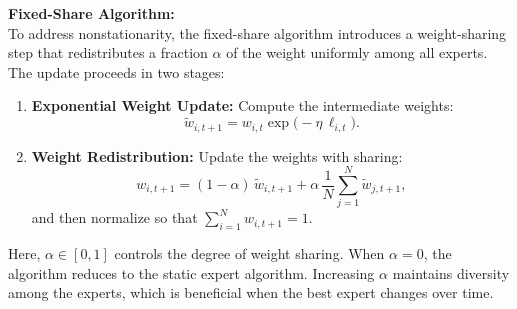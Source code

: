 \documentclass{article}
\begin{document}
\noindent\textbf{Fixed-Share Algorithm:} \\
To address nonstationarity, the fixed-share algorithm introduces a weight-sharing step that redistributes a fraction $\alpha$ of the weight uniformly among all experts. The update proceeds in two stages:

\begin{enumerate}
    \item \textbf{Exponential Weight Update:} Compute the intermediate weights:
    \[
    \tilde{w}_{i,t+1} = w_{i,t} \exp\bigl(-\eta\,\ell_{i,t}\bigr).
    \]
    
    \item \textbf{Weight Redistribution:} Update the weights with sharing:
    \[
    w_{i,t+1} = (1-\alpha) \, \tilde{w}_{i,t+1} + \alpha \, \frac{1}{N} \sum_{j=1}^{N} \tilde{w}_{j,t+1},
    \]
    and then normalize so that $\sum_{i=1}^{N} w_{i,t+1} = 1$.
\end{enumerate}
Here, $\alpha \in [0,1]$ controls the degree of weight sharing. When $\alpha = 0$, the algorithm reduces to the static expert algorithm. Increasing $\alpha$ maintains diversity among the experts, which is beneficial when the best expert changes over time.
\end{document}
